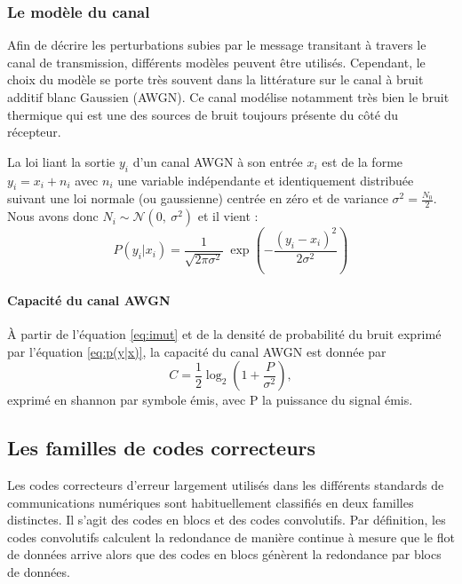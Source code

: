 \subsubsection{Le modèle du canal}\label{ss:cod_canal}
Afin de décrire les perturbations subies par le message transitant à travers le canal de transmission, différents modèles 
peuvent être utilisés. 
Cependant, le choix du modèle se porte très souvent dans la littérature sur le canal à bruit additif blanc Gaussien 
(AWGN). 
Ce canal modélise notamment très bien le bruit thermique qui est une des sources de bruit toujours présente du côté du récepteur.

La loi liant la sortie $y_i$ d'un canal AWGN à son entrée $x_i$ est de la forme $y_i=x_i+n_i$ avec $n_i$ une variable 
indépendante et identiquement distribuée suivant une loi normale (ou gaussienne) centrée en zéro et de variance $\sigma^2 = \frac{N_0}{2}$. Nous avons donc
$N_i \sim \mathcal{N}(0,\ \sigma^2)$ et il vient :
\begin{equation}
	\label{eq:p(y|x)}
	P(y_i|x_i) = \frac{1}{\sqrt{2\pi \sigma^2}}~\exp\left(-{\frac{(y_i-x_i)^2}{2\sigma^2}}\right)
\end{equation}

\paragraph*{Capacité du canal AWGN}
À partir de l'équation \ref{eq:imut} et de la densité de probabilité du bruit exprimé par l'équation \ref{eq:p(y|x)}, la 
capacité du canal AWGN est donnée par \begin{equation}\label{eq:capacity}
C = \frac{1}{2} \log_2\left(1 + \frac{P}{\sigma^2}\right),
\end{equation}
exprimé en shannon par symbole émis, avec P la puissance du signal émis.

\subsection{Les familles de codes correcteurs}
Les codes correcteurs d'erreur largement utilisés dans les différents standards de communications numériques 
sont habituellement classifiés en deux familles distinctes. Il s'agit des codes en blocs et des codes convolutifs. Par définition, 
les codes convolutifs calculent la redondance de manière continue à mesure que le flot de données arrive alors que des codes en blocs génèrent la redondance par blocs de données.
